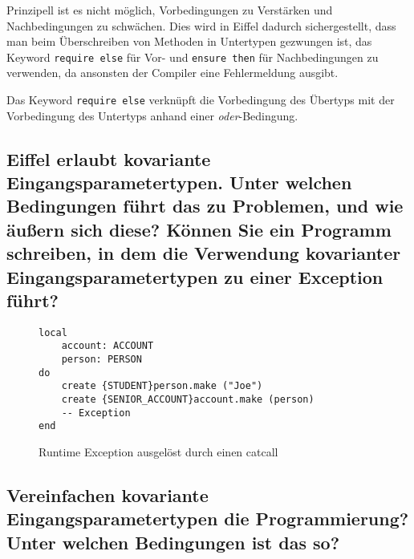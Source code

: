 \documentclass[a4paper,10pt]{article}
\begin{document}
Prinzipell ist es nicht möglich, Vorbedingungen zu Verstärken und Nachbedingungen zu schwächen. Dies wird in Eiffel dadurch sichergestellt, dass man beim Überschreiben von Methoden in Untertypen gezwungen ist, das Keyword \verb+require else+ für Vor- und \verb+ensure then+ für Nachbedingungen zu verwenden, da ansonsten der Compiler eine Fehlermeldung ausgibt.

Das Keyword \verb+require else+ verknüpft die Vorbedingung des Übertyps mit der Vorbedingung des Untertyps anhand einer \textit{oder}-Bedingung.


\subsection{Eiffel erlaubt kovariante Eingangsparametertypen. Unter welchen Bedingungen 
führt das zu Problemen, und wie äußern sich diese? Können Sie ein Programm 
schreiben, in dem die Verwendung kovarianter Eingangsparametertypen zu einer 
Exception führt?}

\vspace{3mm}


\begin{comment}
See http://docs.eiffel.com/book/method/et-inheritance#Covariance.2C_anchored_declarations.2C_and_.22catcalls.22
\end{comment}

\begin{figure}
\begin{lstlisting}
local
    account: ACCOUNT
    person: PERSON
do
    create {STUDENT}person.make ("Joe")
    create {SENIOR_ACCOUNT}account.make (person)
    -- Exception
end
\end{lstlisting}
\caption{Runtime Exception ausgel\"ost durch einen catcall}
\end{figure}

\vspace{3mm}


\subsection{Vereinfachen kovariante Eingangsparametertypen die Programmierung? Unter 
welchen Bedingungen ist das so?}
\end{document}
